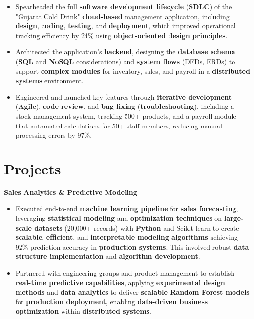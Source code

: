 \documentclass[a4paper,10pt]{article}
\begin{document}
\begin{itemize}[leftmargin=*, itemsep=0pt, parsep=1pt] %
\vspace{-7mm}
    \item Spearheaded the full \textbf{software development lifecycle} (\textbf{SDLC}) of the "Gujarat Cold Drink" \textbf{cloud-based} management application, including \textbf{design}, \textbf{coding}, \textbf{testing}, and \textbf{deployment}, which improved operational tracking efficiency by 24\% using \textbf{object-oriented design principles}.
\item Architected the application's \textbf{backend}, designing the \textbf{database schema} (\textbf{SQL} and \textbf{NoSQL} considerations) and \textbf{system flows} (DFDs, ERDs) to support \textbf{complex modules} for inventory, sales, and payroll in a \textbf{distributed systems} environment.
\item Engineered and launched key features through \textbf{iterative development} (\textbf{Agile}), \textbf{code review}, and \textbf{bug fixing} (\textbf{troubleshooting}), including a stock management system, tracking 500+ products, and a payroll module that automated calculations for 50+ staff members, reducing manual processing errors by 97\%. 

\end{itemize}

\vspace{-4mm}

\section*{Projects}
\textbf{Sales Analytics \& Predictive Modeling} \\
\begin{itemize}[leftmargin=*, itemsep=0pt, parsep=1pt]
\vspace{-7mm}
    \item Executed end-to-end \textbf{machine learning pipeline} for \textbf{sales forecasting}, leveraging \textbf{statistical modeling} and \textbf{optimization techniques} on \textbf{large-scale datasets} (20,000+ records) with \textbf{Python} and Scikit-learn to create \textbf{scalable}, \textbf{efficient}, and \textbf{interpretable modeling algorithms} achieving 92\% prediction accuracy in \textbf{production systems}. This involved robust \textbf{data structure implementation} and \textbf{algorithm development}.
    \item Partnered with engineering groups and product management to establish \textbf{real-time predictive capabilities}, applying \textbf{experimental design methods} and \textbf{data analytics} to deliver \textbf{scalable Random Forest models} for \textbf{production deployment}, enabling \textbf{data-driven business optimization} within \textbf{distributed systems}.
    \end{itemize}
\end{document}

